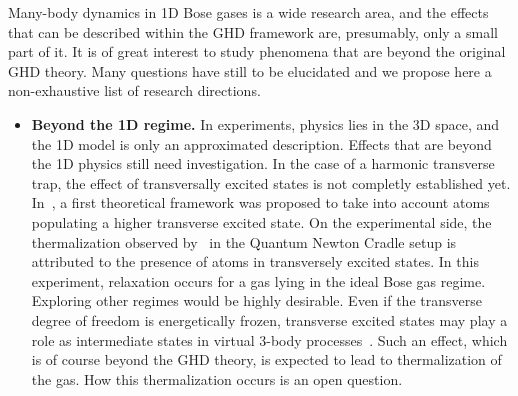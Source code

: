 \documentclass[onecolumn,amsfonts,showpacs,superscriptaddress]{revtex4-1}
\begin{document}
    Many-body dynamics in 1D Bose gases is a wide research area, and the effects that can be described within the GHD framework are, presumably, only a small part of it. It is of great interest to study phenomena that are beyond the original GHD theory.
    Many questions have still to be elucidated and we propose here a non-exhaustive list of research directions.
    \begin{itemize}
        \item {\bf Beyond the 1D regime.}  In experiments, physics lies in the 3D space, and the 1D model is only an approximated description. Effects that are beyond the 1D physics still need investigation. In the case of a harmonic transverse trap, the effect of transversally excited states is not completly established yet. In~\citep{moller_extension_2021}, a first theoretical framework was proposed to take into account atoms populating a higher transverse excited state. 
        On the experimental side, the thermalization observed by~\cite{li_relaxation_2020} in the Quantum Newton Cradle setup is attributed to the presence of atoms in transversely excited states. In this experiment, relaxation occurs for a gas lying in the ideal Bose gas regime. Exploring other regimes would be highly desirable. 
        Even if the transverse degree of freedom is energetically frozen, transverse excited states may play a role as intermediate states in virtual 3-body processes~\citep{mazets_breakdown_2008}. Such an effect, which is of course beyond the GHD theory, is expected to lead to  thermalization of the gas. How this thermalization occurs is an open question. 
        

\end{itemize}
\end{document}

